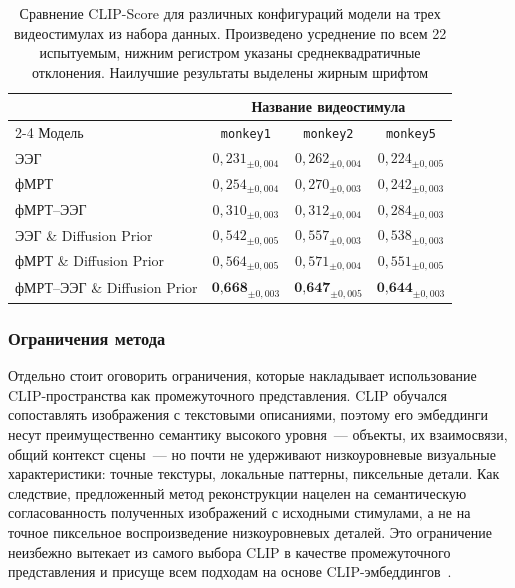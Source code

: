 \begin{table}[h!]
    \centering
    \caption{Сравнение CLIP-Score для различных конфигураций модели на трех видеостимулах из набора данных. Произведено усреднение по всем 22 испытуемым, нижним регистром указаны среднеквадратичные отклонения. Наилучшие результаты выделены жирным шрифтом}
    \label{tab:clip_scores}
    \begin{tabular}{lccc}
        \toprule
        & \multicolumn{3}{c}{Название видеостимула} \\
        \cline{2-4}
        Модель & \texttt{monkey1} & \texttt{monkey2} & \texttt{monkey5} \\
        \midrule
        ЭЭГ & $0{,}231_{\pm 0{,}004}$ & $0{,}262_{\pm 0{,}004}$ & $0{,}224_{\pm 0{,}005}$ \\
        фМРТ & $0{,}254_{\pm 0{,}004}$ & $0{,}270_{\pm 0{,}003}$ & $0{,}242_{\pm 0{,}003}$ \\
        фМРТ--ЭЭГ & $0{,}310_{\pm 0{,}003}$ & $0{,}312_{\pm 0{,}004}$ & $0{,}284_{\pm 0{,}003}$ \\
        ЭЭГ \& Diffusion Prior & $0{,}542_{\pm 0{,}005}$ & $0{,}557_{\pm 0{,}003}$ & $0{,}538_{\pm 0{,}003}$ \\
        фМРТ \& Diffusion Prior & $0{,}564_{\pm 0{,}005}$ & $0{,}571_{\pm 0{,}004}$ & $0{,}551_{\pm 0{,}005}$ \\
        фМРТ--ЭЭГ \& Diffusion Prior & $\textbf{0{,}668}_{\pm 0{,}003}$ & $\textbf{0{,}647}_{\pm 0{,}005}$ & $\textbf{0{,}644}_{\pm 0{,}003}$ \\
        \bottomrule
    \end{tabular}
\end{table}

\subsubsection{Ограничения метода}\label{sec4:limits}

Отдельно стоит оговорить ограничения, которые накладывает использование CLIP-пространства как промежуточного представления. CLIP обучался сопоставлять изображения с текстовыми описаниями, поэтому его эмбеддинги несут преимущественно семантику высокого уровня~--- объекты, их взаимосвязи, общий контекст сцены~--- но почти не удерживают низкоуровневые визуальные характеристики: точные текстуры, локальные паттерны, пиксельные детали. Как следствие, предложенный метод реконструкции нацелен на семантическую согласованность полученных изображений с исходными стимулами, а не на точное пиксельное воспроизведение низкоуровневых деталей. Это ограничение неизбежно вытекает из самого выбора CLIP в качестве промежуточного представления и присуще всем подходам на основе CLIP-эмбеддингов~\cite{huang2021fmri, li2024visual, scotti2023reconstructingmindseyefmritoimage}.


